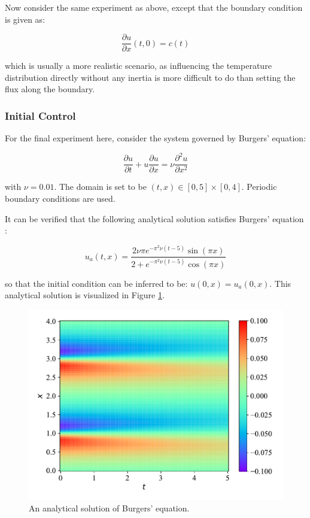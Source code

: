 Now consider the same experiment as above, except that the boundary condition is given as:

\begin{equation}
    \frac{\partial u}{\partial x}(t, 0) = c(t)
\end{equation}

\noindent which is usually a more realistic scenario, as influencing the temperature distribution directly without any inertia is more difficult to do than setting the flux along the boundary.

\subsubsection{Initial Control}

For the final experiment here, consider the system governed by Burgers' equation:

\begin{equation}
    \frac{\partial u}{\partial t} + u \frac{\partial u}{\partial x} = \nu \frac{\partial^2 u}{\partial x^2}
\end{equation}

\noindent with $\nu = 0.01$. The domain is set to be $(t, x) \in [0, 5] \times [0, 4]$. Periodic boundary conditions are used.

It can be verified that the following analytical solution satisfies Burgers' equation \cite{pinnoptimalcontrol}:

\begin{equation}
    u_a(t, x) = \frac{2 \nu \pi e^{- \pi^2 \nu (t - 5)} \sin (\pi x)}{2 + e^{- \pi^2 \nu (t - 5)} \cos(\pi x)}
\end{equation}

\noindent so that the initial condition can be inferred to be: $u(0, x) = u_a(0, x)$. This analytical solution is visualized in Figure \ref{fig:burger_control_analytical}.

\begin{figure}[H]
    \centering
    \includegraphics[width=1.0\linewidth]{Figures/IntermediateExperiments/OptimalControl/burger_control_true.pdf}
    \caption{An analytical solution of Burgers' equation.}
    \label{fig:burger_control_analytical}
\end{figure}

